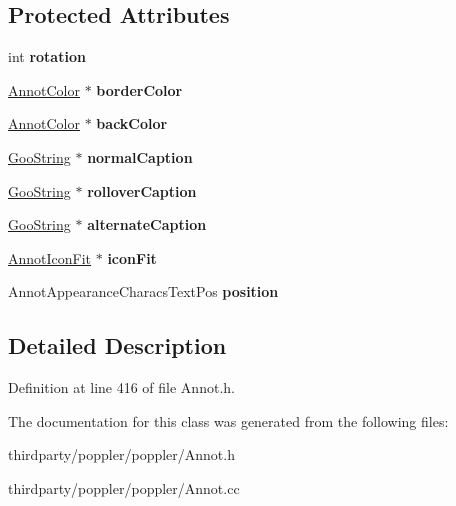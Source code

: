 \subsection*{Protected Attributes}
\begin{DoxyCompactItemize}
\item 
\mbox{\label{class_annot_appearance_characs_a6c9f94b3bdff6b86a4d0d850b0d9f9ab}} 
int {\bfseries rotation}
\item 
\mbox{\label{class_annot_appearance_characs_a0b46cb46a24db7daa0a0c6fa6c424ca2}} 
\hyperlink{class_annot_color}{Annot\+Color} $\ast$ {\bfseries border\+Color}
\item 
\mbox{\label{class_annot_appearance_characs_a6f265583c148f09d449804f21ff75cb8}} 
\hyperlink{class_annot_color}{Annot\+Color} $\ast$ {\bfseries back\+Color}
\item 
\mbox{\label{class_annot_appearance_characs_a9d084829b24b252ec3317e02287f3085}} 
\hyperlink{class_goo_string}{Goo\+String} $\ast$ {\bfseries normal\+Caption}
\item 
\mbox{\label{class_annot_appearance_characs_a5e6beb4e3d1b08f1626c057b3d8c19f4}} 
\hyperlink{class_goo_string}{Goo\+String} $\ast$ {\bfseries rollover\+Caption}
\item 
\mbox{\label{class_annot_appearance_characs_abbae2e24f5b7a25440b47a67b1b061cb}} 
\hyperlink{class_goo_string}{Goo\+String} $\ast$ {\bfseries alternate\+Caption}
\item 
\mbox{\label{class_annot_appearance_characs_a3710688c8346ad8d7be671df1069220b}} 
\hyperlink{class_annot_icon_fit}{Annot\+Icon\+Fit} $\ast$ {\bfseries icon\+Fit}
\item 
\mbox{\label{class_annot_appearance_characs_a62e7d8701e30427f2d070e9a85777ab3}} 
Annot\+Appearance\+Characs\+Text\+Pos {\bfseries position}
\end{DoxyCompactItemize}


\subsection{Detailed Description}


Definition at line 416 of file Annot.\+h.



The documentation for this class was generated from the following files\+:\begin{DoxyCompactItemize}
\item 
thirdparty/poppler/poppler/Annot.\+h\item 
thirdparty/poppler/poppler/Annot.\+cc\end{DoxyCompactItemize}
